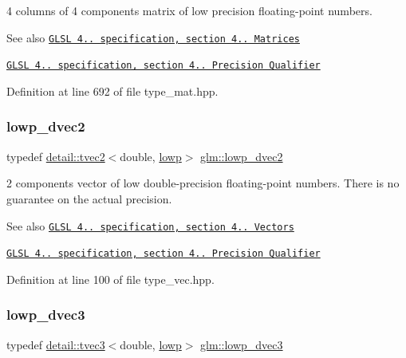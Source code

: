 4 columns of 4 components matrix of low precision floating-\/point numbers.

\begin{DoxySeeAlso}{See also}
\href{http://www.opengl.org/registry/doc/GLSLangSpec.4.20.8.pdf}{\tt G\+L\+SL 4.. specification, section 4.. Matrices} 

\href{http://www.opengl.org/registry/doc/GLSLangSpec.4.20.8.pdf}{\tt G\+L\+SL 4.. specification, section 4.. Precision Qualifier} 
\end{DoxySeeAlso}


Definition at line 692 of file type\+\_\+mat.\+hpp.

\mbox{\label{group__core__precision_ga27a115a27d5f065e8c043f57191d583b}} 
\subsubsection{\texorpdfstring{lowp\+\_\+dvec2}{lowp\_dvec2}}
{\footnotesize\ttfamily typedef \hyperlink{structglm_1_1detail_1_1tvec2}{detail\+::tvec2}$<$double, \hyperlink{namespaceglm_a0f04f086094c747d227af4425893f545ae161af3fc695e696ce3bf69f7332bc2d}{lowp}$>$ \hyperlink{group__core__precision_ga27a115a27d5f065e8c043f57191d583b}{glm\+::lowp\+\_\+dvec2}}

2 components vector of low double-\/precision floating-\/point numbers. There is no guarantee on the actual precision.

\begin{DoxySeeAlso}{See also}
\href{http://www.opengl.org/registry/doc/GLSLangSpec.4.20.8.pdf}{\tt G\+L\+SL 4.. specification, section 4.. Vectors} 

\href{http://www.opengl.org/registry/doc/GLSLangSpec.4.20.8.pdf}{\tt G\+L\+SL 4.. specification, section 4.. Precision Qualifier} 
\end{DoxySeeAlso}


Definition at line 100 of file type\+\_\+vec.\+hpp.

\mbox{\label{group__core__precision_ga9bdb864f7242863e1227e3209f5b2dc4}} 
\subsubsection{\texorpdfstring{lowp\+\_\+dvec3}{lowp\_dvec3}}
{\footnotesize\ttfamily typedef \hyperlink{structglm_1_1detail_1_1tvec3}{detail\+::tvec3}$<$double, \hyperlink{namespaceglm_a0f04f086094c747d227af4425893f545ae161af3fc695e696ce3bf69f7332bc2d}{lowp}$>$ \hyperlink{group__core__precision_ga9bdb864f7242863e1227e3209f5b2dc4}{glm\+::lowp\+\_\+dvec3}}

